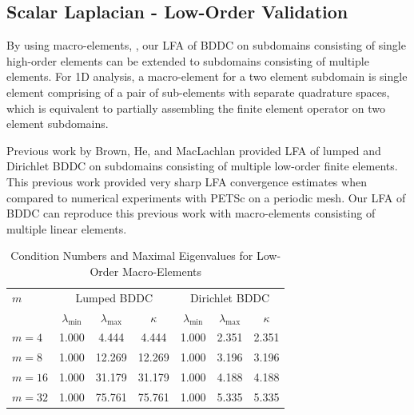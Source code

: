 \documentclass[review]{siamart190516}
\begin{document}
\subsection{Scalar Laplacian - Low-Order Validation}\label{sec:lowordervalidate}

By using macro-elements, \cite{kumar2019local, brown2019local}, our LFA of BDDC on subdomains consisting of single high-order elements can be extended to subdomains consisting of multiple elements.
For 1D analysis, a macro-element for a two element subdomain is single element comprising of a pair of sub-elements with separate quadrature spaces, which is equivalent to partially assembling the finite element operator on two element subdomains.

Previous work by Brown, He, and MacLachlan \cite{brown2019local} provided LFA of lumped and Dirichlet BDDC on subdomains consisting of multiple low-order finite elements.
This previous work provided very sharp LFA convergence estimates when compared to numerical experiments with PETSc \cite{petsc-user-ref} on a periodic mesh.
Our LFA of BDDC can reproduce this previous work with macro-elements consisting of multiple linear elements.

\begin{table}[ht!]
\begin{center}
\begin{tabular}{l ccc ccc}
  \toprule
  $m$  &  \multicolumn{3}{c}{Lumped BDDC}  &  \multicolumn{3}{c}{Dirichlet BDDC}  \\
                      &  $\lambda_{\min}$  &  $\lambda_{\max}$  &  $\kappa$ & $\lambda_{\min}$  &  $\lambda_{\max}$ & $\kappa$  \\
  \toprule
  $m = 4$   &  1.000  &   4.444  &   4.444  &  1.000  &  2.351  &  2.351  \\
  $m = 8$   &  1.000  &  12.269  &  12.269  &  1.000  &  3.196  &  3.196  \\
  $m = 16$  &  1.000  &  31.179  &  31.179  &  1.000  &  4.188  &  4.188  \\
  $m = 32$  &  1.000  &  75.761  &  75.761  &  1.000  &  5.335  &  5.335  \\
  \bottomrule
\end{tabular}
\end{center}
\caption{Condition Numbers and Maximal Eigenvalues for Low-Order Macro-Elements}
\label{table:macro_element_bddc}
\end{table}
\end{document}

